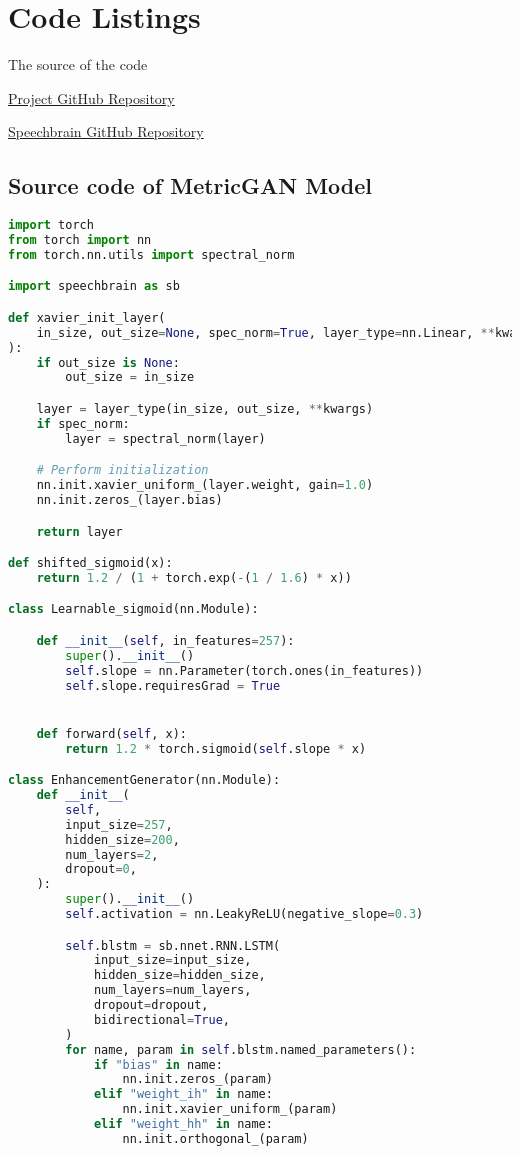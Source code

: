 \appendix
\chapter{Code Listings}

The source of the code

\href{https://github.com/bakievelbek/project-thesis}{Project GitHub Repository}

\href{https://github.com/speechbrain/speechbrain}{Speechbrain GitHub Repository}


\section{Source code of MetricGAN Model} \label{appendix:metricgan}
\begin{lstlisting}[language=Python, caption={MetricGAN Model}]
import torch
from torch import nn
from torch.nn.utils import spectral_norm

import speechbrain as sb

def xavier_init_layer(
    in_size, out_size=None, spec_norm=True, layer_type=nn.Linear, **kwargs
):
    if out_size is None:
        out_size = in_size

    layer = layer_type(in_size, out_size, **kwargs)
    if spec_norm:
        layer = spectral_norm(layer)

    # Perform initialization
    nn.init.xavier_uniform_(layer.weight, gain=1.0)
    nn.init.zeros_(layer.bias)

    return layer

def shifted_sigmoid(x):
    return 1.2 / (1 + torch.exp(-(1 / 1.6) * x))

class Learnable_sigmoid(nn.Module):

    def __init__(self, in_features=257):
        super().__init__()
        self.slope = nn.Parameter(torch.ones(in_features))
        self.slope.requiresGrad = True


    def forward(self, x):
        return 1.2 * torch.sigmoid(self.slope * x)

class EnhancementGenerator(nn.Module):
    def __init__(
        self,
        input_size=257,
        hidden_size=200,
        num_layers=2,
        dropout=0,
    ):
        super().__init__()
        self.activation = nn.LeakyReLU(negative_slope=0.3)

        self.blstm = sb.nnet.RNN.LSTM(
            input_size=input_size,
            hidden_size=hidden_size,
            num_layers=num_layers,
            dropout=dropout,
            bidirectional=True,
        )
        for name, param in self.blstm.named_parameters():
            if "bias" in name:
                nn.init.zeros_(param)
            elif "weight_ih" in name:
                nn.init.xavier_uniform_(param)
            elif "weight_hh" in name:
                nn.init.orthogonal_(param)


\end{lstlisting}
